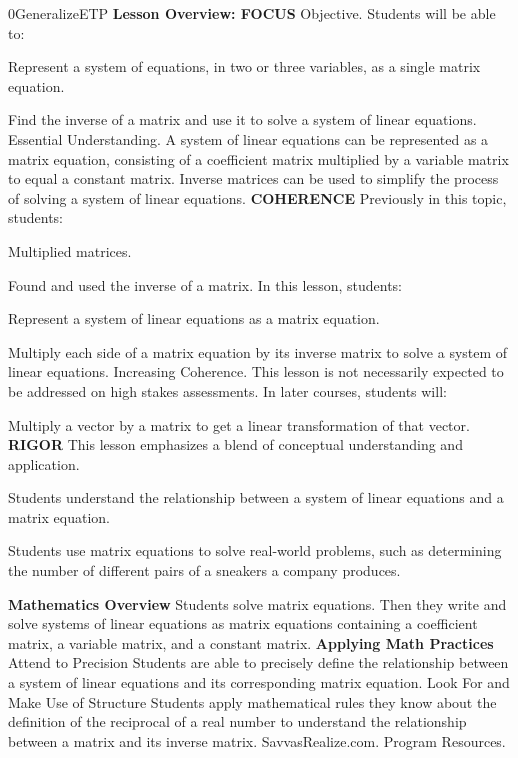 \documentclass{article}
\newenvironment{te-addendum}[2]{}{}     %
\newcommand{\te}[1]{}                   %
\begin{document}
\begin{te-addendum}{0}{GeneralizeETP}
\textbf{Lesson Overview: FOCUS}
Objective. Students will be able to:
\item Represent a system of equations, in two or three variables, as a single matrix equation.
\item Find the inverse of a matrix and use it to solve a system of linear equations.
Essential Understanding. A system of linear equations can be represented as a matrix equation, consisting of a coefficient matrix multiplied by a variable matrix to equal a constant matrix. Inverse matrices can be used to simplify the process of solving a system of linear equations.
\textbf{COHERENCE}
Previously in this topic, students:
\item Multiplied matrices.
\item Found and used the inverse of a matrix.
In this lesson, students:
\item Represent a system of linear equations as a matrix equation.
\item Multiply each side of a matrix equation by its inverse matrix to solve a system of linear equations.
Increasing Coherence. This lesson is not necessarily expected to be addressed on high stakes assessments.
In later courses, students will:
\item Multiply a vector by a matrix to get a linear transformation of that vector.
\textbf{RIGOR}
This lesson emphasizes a blend of conceptual understanding and application.
\item Students understand the relationship between a system of linear equations and a matrix equation.
\item Students use matrix equations to solve real-world problems, such as determining the number of different pairs of a sneakers a company produces.
\te{Printed "pairs of a sneakers"; likely "pairs of sneakers."}
\textbf{Mathematics Overview}
Students solve matrix equations. Then they write and solve systems of linear equations as matrix equations containing a coefficient matrix, a variable matrix, and a constant matrix.
\textbf{Applying Math Practices}
Attend to Precision
Students are able to precisely define the relationship between a system of linear equations and its corresponding matrix equation.
Look For and Make Use of Structure
Students apply mathematical rules they know about the definition of the reciprocal of a real number to understand the relationship between a matrix and its inverse matrix.
SavvasRealize.com. Program Resources.
\end{te-addendum}
\end{document}
